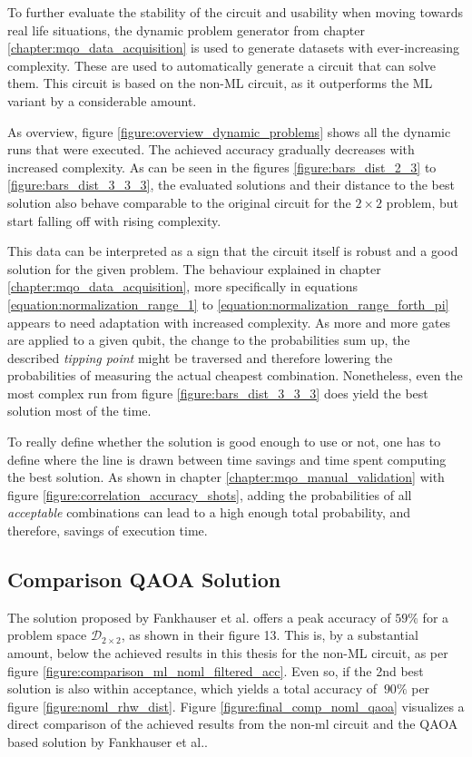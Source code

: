 To further evaluate the stability of the circuit and usability when moving towards real life situations, the dynamic problem generator from chapter \ref{chapter:mqo_data_acquisition} is used to generate datasets with ever-increasing complexity. These are used to automatically generate a circuit that can solve them. This circuit is based on the non-ML circuit, as it outperforms the ML variant by a considerable amount. \par
As overview, figure \ref{figure:overview_dynamic_problems} shows all the dynamic runs that were executed. The achieved accuracy gradually decreases with increased complexity. As can be seen in the figures \ref{figure:bars_dist_2_3} to \ref{figure:bars_dist_3_3_3}, the evaluated solutions and their distance to the best solution also behave comparable to the original circuit for the $2\times2$ problem, but start falling off with rising complexity. \par
This data can be interpreted as a sign that the circuit itself is robust and a good solution for the given problem. The behaviour explained in chapter \ref{chapter:mqo_data_acquisition}, more specifically in equations \ref{equation:normalization_range_1} to \ref{equation:normalization_range_forth_pi} appears to need adaptation with increased complexity. As more and more gates are applied to a given qubit, the change to the probabilities sum up, the described \emph{tipping point} might be traversed and therefore lowering the probabilities of measuring the actual cheapest combination. Nonetheless, even the most complex run from figure \ref{figure:bars_dist_3_3_3} does yield the best solution most of the time. \par
To really define whether the solution is good enough to use or not, one has to define where the line is drawn between time savings and time spent computing the best solution. As shown in chapter \ref{chapter:mqo_manual_validation} with figure \ref{figure:correlation_accuracy_shots}, adding the probabilities of all \emph{acceptable} combinations can lead to a high enough total probability, and therefore, savings of execution time.

\subsection{Comparison QAOA Solution}
The solution proposed by Fankhauser et al.\cite{fankhauser_multiple_2021} offers a peak accuracy of $59\%$ for a problem space $\mathcal{D}_{2\times2}$, as shown in their figure 13. This is, by a substantial amount, below the achieved results in this thesis for the non-ML circuit, as per figure \ref{figure:comparison_ml_noml_filtered_acc}. Even so, if the 2nd best solution is also within acceptance, which yields a total accuracy of $~90\%$ per figure \ref{figure:noml_rhw_dist}. Figure \ref{figure:final_comp_noml_qaoa} visualizes a direct comparison of the achieved results from the non-ml circuit and the QAOA based solution by Fankhauser et al.\cite{fankhauser_multiple_2021}.\par


